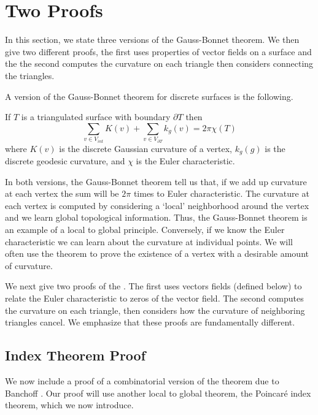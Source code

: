 \section{Two Proofs}


In this section, we state three versions of the Gauss-Bonnet theorem.
We then give two different proofs, the first uses properties of vector fields
on a surface and the the second computes the curvature on each triangle
then considers connecting the triangles.





A version of the Gauss-Bonnet theorem for discrete surfaces is the following.

\begin{theorem} \label{thm:g-b-d}

If $T$ is a triangulated surface with  boundary $\partial T$ then
$$\sum_{v\in V_{int}} K(v) + \sum_{v\in V_{\partial T}} k_g(v) = 2\pi \chi(T)$$
where $K(v)$ is the discrete Gaussian curvature
of a vertex, $k_g(g)$ is the discrete geodesic curvature,  and
$\chi$ is the Euler characteristic.
\end{theorem}

In both versions, the Gauss-Bonnet theorem tell us that, if we add up curvature
at each vertex the sum will be $2\pi$ times to Euler characteristic.
The curvature at each vertex is computed by considering a `local' neighborhood
around the vertex and we learn global topological information. Thus, the Gauss-Bonnet 
theorem is an example of a local to global principle. 
Conversely, if we know the Euler characteristic we can learn about the curvature
at individual points. We will often use the theorem to prove the existence of
a vertex with a desirable amount of curvature.

We next give two proofs of the . The first uses vectors fields (defined below)
to relate the Euler characteristic to zeros of the vector field. The second computes
the curvature on each triangle, then considers how the curvature of neighboring triangles
cancel. We emphasize that these proofs are fundamentally different.

\subsection{Index Theorem Proof}



We now include a proof of a combinatorial version of the theorem due to Banchoff
\cite{banchoff_critical_1970}. Our proof will use another local to global theorem,
the Poincar\'e index theorem, which we now introduce.

